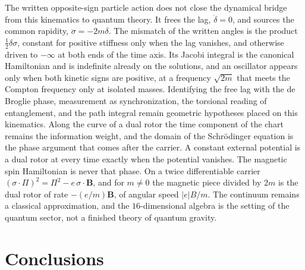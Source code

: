 \documentclass[a4paper]{article}
\begin{document}
The written opposite-sign particle action does not close the dynamical bridge from this kinematics to quantum theory. It frees the lag, $\ddot\delta=0$, and sources the common rapidity, $\ddot\sigma=-2m\delta$. The mismatch of the written angles is the product $\tfrac12\delta\sigma$, constant for positive stiffness only when the lag vanishes, and otherwise driven to $-\infty$ at both ends of the time axis. Its Jacobi integral is the canonical Hamiltonian and is indefinite already on the solutions, and an oscillator appears only when both kinetic signs are positive, at a frequency $\sqrt{2m}$ that meets the Compton frequency only at isolated masses. Identifying the free lag with the de Broglie phase, measurement as synchronization, the torsional reading of entanglement, and the path integral remain geometric hypotheses placed on this kinematics. Along the curve of a dual rotor the time component of the chart remains the information weight, and the domain of the Schr\"odinger equation is the phase argument that comes after the carrier. A constant external potential is a dual rotor at every time exactly when the potential vanishes. The magnetic spin Hamiltonian is never that phase. On a twice differentiable carrier $(\sigma\cdot\Pi)^2=\Pi^2-e\,\sigma\cdot\mathbf B$, and for $m\neq 0$ the magnetic piece divided by $2m$ is the dual rotor of rate $-(e/m)\mathbf B$, of angular speed $|e|B/m$. The continuum remains a classical approximation, and the $16$-dimensional algebra is the setting of the quantum sector, not a finished theory of quantum gravity.

\section{Conclusions}
\label{sec:conclusions}
\end{document}
